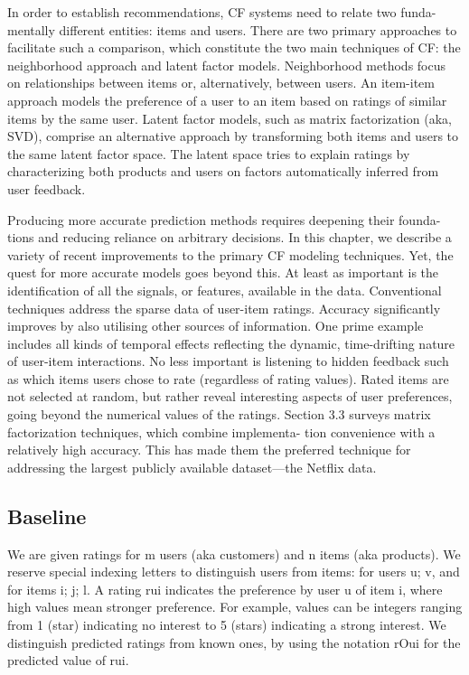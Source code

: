 In order to establish recommendations, CF systems need to relate two funda- mentally different entities: items and users. There are two primary approaches to facilitate such a comparison, which constitute the two main techniques of CF: the neighborhood approach and latent factor models. Neighborhood methods focus on relationships between items or, alternatively, between users. An item-item approach models the preference of a user to an item based on ratings of similar items by the same user. Latent factor models, such as matrix factorization (aka, SVD), comprise an alternative approach by transforming both items and users to the same latent factor space. The latent space tries to explain ratings by characterizing both products and users on factors automatically inferred from user feedback.

Producing more accurate prediction methods requires deepening their founda- tions and reducing reliance on arbitrary decisions. In this chapter, we describe a variety of recent improvements to the primary CF modeling techniques. Yet, the quest for more accurate models goes beyond this. At least as important is the identification of all the signals, or features, available in the data. Conventional techniques address the sparse data of user-item ratings. Accuracy significantly improves by also utilising other sources of information. One prime example includes all kinds of temporal effects reflecting the dynamic, time-drifting nature of user-item interactions. No less important is listening to hidden feedback such as which items users chose to rate (regardless of rating values). Rated items are not selected at random, but rather reveal interesting aspects of user preferences, going beyond the numerical values of the ratings.
Section 3.3 surveys matrix factorization techniques, which combine implementa- tion convenience with a relatively high accuracy. This has made them the preferred technique for addressing the largest publicly available dataset—the Netflix data.

\subsection{Baseline}

We are given ratings for m users (aka customers) and n items (aka products). We reserve special indexing letters to distinguish users from items: for users u; v, and for items i; j; l. A rating rui indicates the preference by user u of item i, where high values mean stronger preference. For example, values can be integers ranging from 1 (star) indicating no interest to 5 (stars) indicating a strong interest. We distinguish predicted ratings from known ones, by using the notation rOui for the predicted value of rui.

